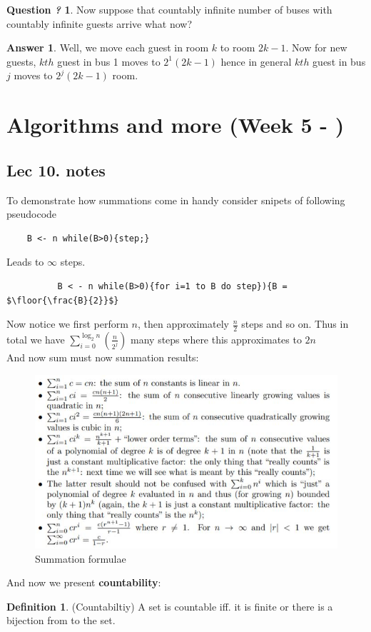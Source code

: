 \documentclass[titlepage]{article}
\theoremstyle{definition}
\newcommand{\floor}[1]{\lfloor #1 \rfloor}
\newtheorem{definition}{Definition}
\numberwithin{equation}{subsection}
\numberwithin{remark}{subsection}
\newtheorem{question}{Question \textit{?}}[subsection]
\newtheorem{answer}{Answer}[subsection]
\begin{document}
\begin{question}
Now suppose that countably infinite number of buses with countably infinite guests arrive what now?
\end{question}
\begin{answer}
Well, we move each guest in room $k$ to room $2k-1$. Now for new guests, $kth$ guest in bus 1 moves to $2^{1}(2k-1)$ hence in general $kth$ guest in bus $j$ moves to $2^{j}(2k-1)$ room. 
\end{answer}
\clearpage
\section{Algorithms and more (Week 5 - )}
\subsection{Lec 10. notes}
To demonstrate how summations come in handy consider snipets of following pseudocode


\begin{verbatim}
    B <- n while(B>0){step;} 
\end{verbatim}
Leads to $\infty$ steps.
\begin{lstlisting}
          B < - n while(B>0){for i=1 to B do step}){B = $\floor{\frac{B}{2}}$}
\end{lstlisting}
Now notice we first perform $n$, then approximately $\frac{n}{2}$ steps and so on. Thus in total we have $\sum_{i=0}^{\log_{2}{n} }(\frac{n}{2^j})$ many steps where this approximates to $2n$
\\
And now sum must now summation results:

\begin{figure}[H]
    \centering
    \includegraphics[scale = 0.7]{epflLectureNotes/advancedComputation/figures/sums.JPG}
    \caption{Summation formulae}
    \label{fig:my_label}
\end{figure}
And now we present \textbf{countability}:
\begin{definition} (Countabiltiy)
A set is countable iff. it is finite or there is a bijection from  to the set. 
\end{definition}
\end{document}
